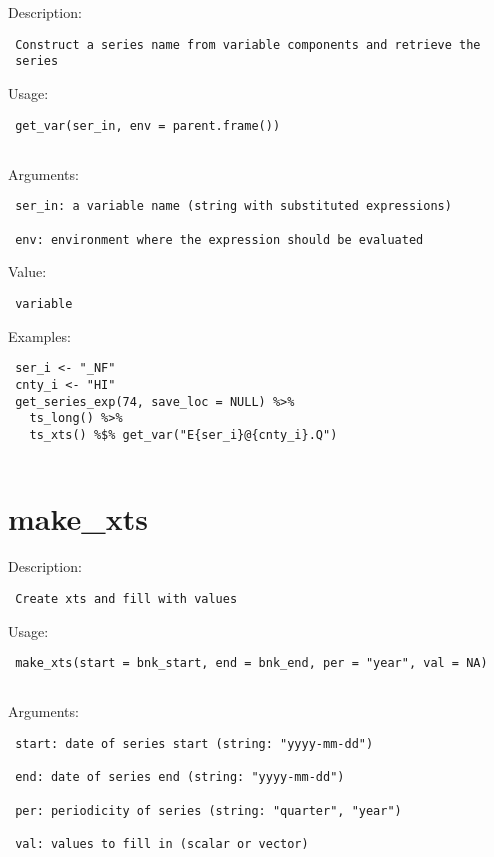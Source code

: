 \documentclass[
  letterpaper,
  DIV=11,
  numbers=noendperiod]{scrreport}
\begin{document}
Description:

\begin{verbatim}
 Construct a series name from variable components and retrieve the
 series
\end{verbatim}

Usage:

\begin{verbatim}
 get_var(ser_in, env = parent.frame())
 
\end{verbatim}

Arguments:

\begin{verbatim}
 ser_in: a variable name (string with substituted expressions)

 env: environment where the expression should be evaluated
\end{verbatim}

Value:

\begin{verbatim}
 variable
\end{verbatim}

Examples:

\begin{verbatim}
 ser_i <- "_NF"
 cnty_i <- "HI"
 get_series_exp(74, save_loc = NULL) %>%
   ts_long() %>%
   ts_xts() %$% get_var("E{ser_i}@{cnty_i}.Q")
 
\end{verbatim}

\section{make\_xts}\label{make_xts}

Description:

\begin{verbatim}
 Create xts and fill with values
\end{verbatim}

Usage:

\begin{verbatim}
 make_xts(start = bnk_start, end = bnk_end, per = "year", val = NA)
 
\end{verbatim}

Arguments:

\begin{verbatim}
 start: date of series start (string: "yyyy-mm-dd")

 end: date of series end (string: "yyyy-mm-dd")

 per: periodicity of series (string: "quarter", "year")

 val: values to fill in (scalar or vector)
\end{verbatim}
\end{document}
